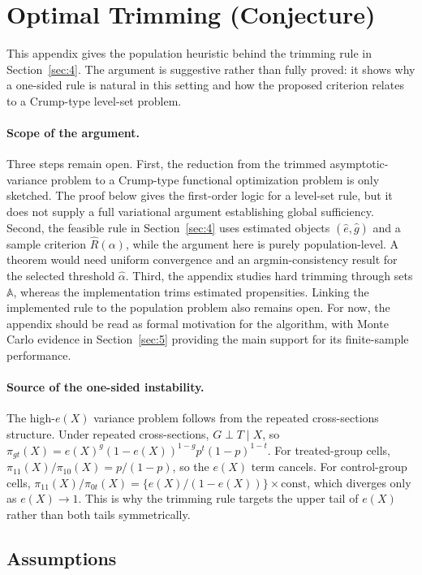 \section{Optimal Trimming (Conjecture)}\label{sec:app_trimming}

This appendix gives the population heuristic behind the trimming rule in Section~\ref{sec:4}. The argument is suggestive rather than fully proved: it shows why a one-sided rule is natural in this setting and how the proposed criterion relates to a Crump-type level-set problem.

\paragraph{Scope of the argument.} Three steps remain open. First, the reduction from the trimmed asymptotic-variance problem to a Crump-type functional optimization problem is only sketched. The proof below gives the first-order logic for a level-set rule, but it does not supply a full variational argument establishing global sufficiency. Second, the feasible rule in Section~\ref{sec:4} uses estimated objects $(\hat e,\hat g)$ and a sample criterion $\hat R(\alpha)$, while the argument here is purely population-level. A theorem would need uniform convergence and an argmin-consistency result for the selected threshold $\hat\alpha$. Third, the appendix studies hard trimming through sets $\mathbb A$, whereas the implementation trims estimated propensities. Linking the implemented rule to the population problem also remains open. For now, the appendix should be read as formal motivation for the algorithm, with Monte Carlo evidence in Section~\ref{sec:5} providing the main support for its finite-sample performance.

\paragraph{Source of the one-sided instability.} The high-$e(X)$ variance problem follows from the repeated cross-sections structure. Under repeated cross-sections, $G\perp T\mid X$, so $\pi_{gt}(X)=e(X)^g(1-e(X))^{1-g}p^t(1-p)^{1-t}$. For treated-group cells, $\pi_{11}(X)/\pi_{10}(X)=p/(1-p)$, so the $e(X)$ term cancels. For control-group cells, $\pi_{11}(X)/\pi_{0t}(X)=\{e(X)/(1-e(X))\}\times\mathrm{const}$, which diverges only as $e(X)\to 1$. This is why the trimming rule targets the upper tail of $e(X)$ rather than both tails symmetrically.

\subsection{Assumptions}

